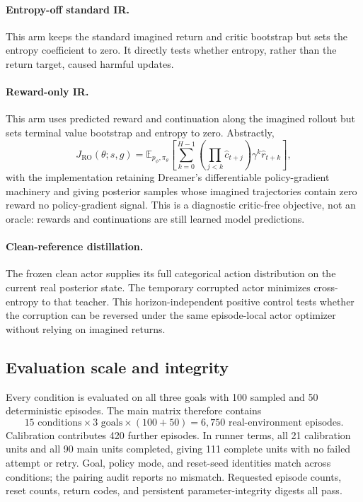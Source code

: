 \documentclass[10pt]{article}
\begin{document}
\paragraph{Entropy-off standard IR.}
This arm keeps the standard imagined return and critic bootstrap but sets the entropy coefficient to zero. It directly tests whether entropy, rather than the return target, caused harmful updates.

\paragraph{Reward-only IR.}
This arm uses predicted reward and continuation along the imagined rollout but sets terminal value bootstrap and entropy to zero. Abstractly,
\begin{equation}
  J_{\mathrm{RO}}(\theta;s,g)
  =\mathbb E_{p_\phi,\pi_\theta}
    \left[\sum_{k=0}^{H-1}\left(\prod_{j<k}\hat c_{t+j}\right)
    \gamma^k\hat r_{t+k}\right],
  \label{eq:rewardonly}
\end{equation}
with the implementation retaining Dreamer's differentiable policy-gradient machinery and giving posterior samples whose imagined trajectories contain zero reward no policy-gradient signal. This is a diagnostic critic-free objective, not an oracle: rewards and continuations are still learned model predictions.

\paragraph{Clean-reference distillation.}
The frozen clean actor supplies its full categorical action distribution on the current real posterior state. The temporary corrupted actor minimizes cross-entropy to that teacher. This horizon-independent positive control tests whether the corruption can be reversed under the same episode-local actor optimizer without relying on imagined returns.

\subsection{Evaluation scale and integrity}

Every condition is evaluated on all three goals with 100 sampled and 50 deterministic episodes. The main matrix therefore contains
\begin{equation}
  15\text{ conditions}\times3\text{ goals}\times(100+50)
  =6{,}750\text{ real-environment episodes}.
\end{equation}
Calibration contributes 420 further episodes. In runner terms, all 21 calibration units and all 90 main units completed, giving 111 complete units with no failed attempt or retry. Goal, policy mode, and reset-seed identities match across conditions; the pairing audit reports no mismatch. Requested episode counts, reset counts, return codes, and persistent parameter-integrity digests all pass.
\end{document}
